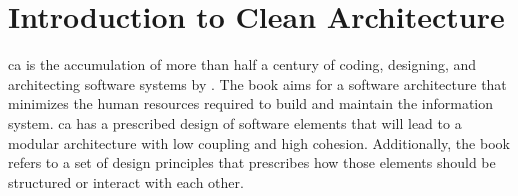 \section{Introduction to Clean Architecture} \label{sec_into_ca}

\gls{ca} is the accumulation of more than half a century of coding, designing, and
architecting software systems by \citeauthor*[]{robert_c_martin_clean_2018}. The book aims
for a software architecture that minimizes the human resources required to build and
maintain the information system. \gls{ca} has a prescribed design of software elements
that will lead to a modular architecture with low coupling and high cohesion.
Additionally, the book refers to a set of design principles that prescribes how those
elements should be structured or interact with each other.
